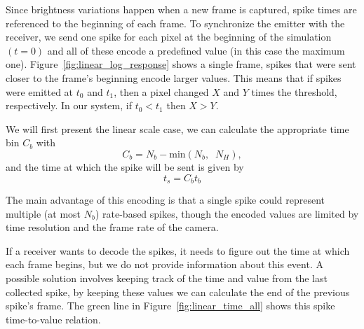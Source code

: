 \documentclass[conference]{IEEEtran}
\begin{document}
Since brightness variations happen when a new frame is captured, spike times are referenced to the beginning of each frame. To synchronize the emitter with the receiver, we send one spike for each pixel at the beginning of the simulation $(t=0)$ and all of these encode a predefined value (in this case the maximum one). Figure~\ref{fig:linear_log_response} shows a single frame, spikes that were sent closer to the frame's beginning encode larger values. This means that if spikes were emitted at $t_{0}$ and $t_{1}$,  then a pixel changed $X$ and  $Y$ times the threshold, respectively. In our system, if $t_{0} < t_{1}$ then $X > Y$.

We will first present the linear scale case, we can calculate the appropriate time bin $C_{b}$ with
\begin{equation}
\label{eq:linear_bin_calc}
C_{b} = N_{b} - \mathrm{min}\left( N_{b}, \;\; N_{H} \right),
\end{equation}
and the time at which the spike will be sent is given by
\begin{equation}
t_{s} = C_{b}t_{b}
\end{equation}

The main advantage of this encoding is that a single spike could represent multiple (at most $N_{b}$) rate-based spikes, though the encoded values are limited by time resolution and the frame rate of the camera.

If a receiver wants to decode the spikes, it needs to figure out the time at which each frame begins, but we do not provide information about this event. A possible solution involves keeping track of the time and value from the last collected spike, by keeping these values we can calculate the end of the previous spike's frame. The green line in Figure~\ref{fig:linear_time_all} shows this spike time-to-value relation. 
\end{document}
